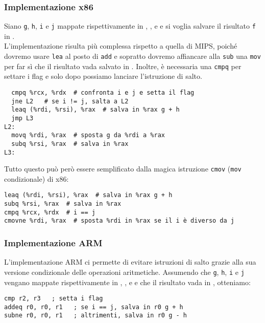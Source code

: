 \documentclass[class=book, crop=false, oneside]{standalone}
\begin{document}
\subsubsection{Implementazione x86}
Siano \texttt{g}, \texttt{h}, \texttt{i} e \texttt{j} mappate rispettivamente in , ,  e  e si voglia salvare il risultato \texttt{f} in .\\
L'implementazione risulta più complessa rispetto a quella di MIPS, poiché dovremo usare \texttt{lea} al posto di \texttt{add} e sopratto dovremo affiancare alla \texttt{sub} una \texttt{mov} per far sì che il risultato vada salvato in . Inoltre, è necessaria una \texttt{cmpq} per settare i flag e solo dopo possiamo lanciare l'istruzione di salto.
\begin{verbatim}
  cmpq %rcx, %rdx  # confronta i e j e setta il flag
  jne L2   # se i != j, salta a L2
  leaq (%rdi, %rsi), %rax  # salva in %rax g + h
  jmp L3
L2:
  movq %rdi, %rax  # sposta g da %rdi a %rax
  subq %rsi, %rax  # salva in %rax
L3:
\end{verbatim}
Tutto questo può però essere semplificato dalla magica istruzione \texttt{cmov} (\texttt{mov} condizionale) di x86:
\begin{verbatim}
leaq (%rdi, %rsi), %rax  # salva in %rax g + h
subq %rsi, %rax  # salva in %rax
cmpq %rcx, %rdx  # i == j
cmovne %rdi, %rax  # sposta %rdi in %rax se il i è diverso da j
\end{verbatim}

\subsubsection{Implementazione ARM}
L'implementazione ARM ci permette di evitare istruzioni di salto grazie alla sua versione condizionale delle operazioni aritmetiche. Assumendo che \texttt{g}, \texttt{h}, \texttt{i} e \texttt{j} vengano mappate rispettivamente in , ,  e  e che il risultato vada in , otteniamo:
\begin{verbatim}
cmp r2, r3   ; setta i flag
addeq r0, r0, r1   ; se i == j, salva in r0 g + h
subne r0, r0, r1   ; altrimenti, salva in r0 g - h
\end{verbatim}
\end{document}
